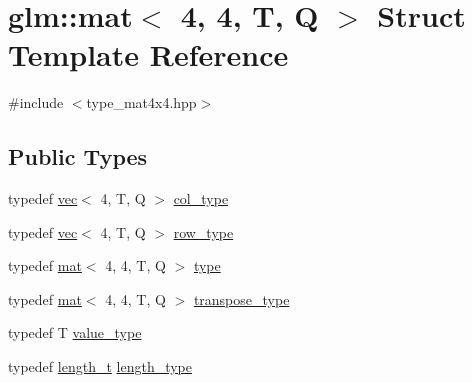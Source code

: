 \hypertarget{structglm_1_1mat_3_014_00_014_00_01_t_00_01_q_01_4}{}\section{glm\+:\+:mat$<$ 4, 4, T, Q $>$ Struct Template Reference}
\label{structglm_1_1mat_3_014_00_014_00_01_t_00_01_q_01_4}


{\ttfamily \#include $<$type\+\_\+mat4x4.\+hpp$>$}

\subsection*{Public Types}
\begin{DoxyCompactItemize}
\item 
typedef \mbox{\hyperlink{structglm_1_1vec}{vec}}$<$ 4, T, Q $>$ \mbox{\hyperlink{structglm_1_1mat_3_014_00_014_00_01_t_00_01_q_01_4_aad430dc291d0156d573c434be7fdecc1}{col\+\_\+type}}
\item 
typedef \mbox{\hyperlink{structglm_1_1vec}{vec}}$<$ 4, T, Q $>$ \mbox{\hyperlink{structglm_1_1mat_3_014_00_014_00_01_t_00_01_q_01_4_a2f05ded6544c98508d5f29e498d2e4dd}{row\+\_\+type}}
\item 
typedef \mbox{\hyperlink{structglm_1_1mat}{mat}}$<$ 4, 4, T, Q $>$ \mbox{\hyperlink{structglm_1_1mat_3_014_00_014_00_01_t_00_01_q_01_4_a2151b2f14fc2ccf6e39a0ca3182270c2}{type}}
\item 
typedef \mbox{\hyperlink{structglm_1_1mat}{mat}}$<$ 4, 4, T, Q $>$ \mbox{\hyperlink{structglm_1_1mat_3_014_00_014_00_01_t_00_01_q_01_4_aae643ca23a5e538e908086e5149f500f}{transpose\+\_\+type}}
\item 
typedef T \mbox{\hyperlink{structglm_1_1mat_3_014_00_014_00_01_t_00_01_q_01_4_ae564877d4d3802415244ba1c83cc4c89}{value\+\_\+type}}
\item 
typedef \mbox{\hyperlink{namespaceglm_a090a0de2260835bee80e71a702492ed9}{length\+\_\+t}} \mbox{\hyperlink{structglm_1_1mat_3_014_00_014_00_01_t_00_01_q_01_4_ae06c2957874bbff5701b304668b5cb01}{length\+\_\+type}}
\end{DoxyCompactItemize}
